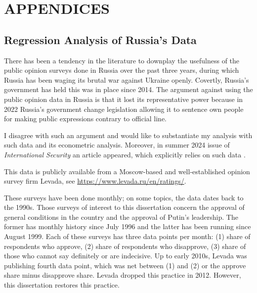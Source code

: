 %
%

\newpage 

\section*{\MakeUppercase{Appendices}}

\appendix
\renewcommand{\thesubsection}{\Alph{subsection}}

\subsection{Regression Analysis of Russia's Data}\label{reg_levada}

There has been a tendency in the literature to downplay the usefulness of the public opinion surveys done in Russia over the past three years, during which Russia has been waging its brutal war against Ukraine openly. Covertly, Russia's government has held this was in place since 2014. The argument against using the public opinion data in Russia is that it lost its representative power because in 2022 Russia's government change legislation allowing it to sentence own people for making public expressions contrary to official line.

I disagree with such an argument and would like to substantiate my analysis with such data and its econometric analysis. Moreover, in summer 2024 issue of \textit{International Security} an article appeared, which explicitly relies on such data \citep{hale2024}.

This data is publicly available from a Moscow-based and well-established opinion survey firm Levada, see {\small \url{https://www.levada.ru/en/ratings/}}.

These surveys have been done monthly; on some topics, the data dates back to the 1990s. Those surveys of interest to this dissertation concern the approval of general conditions in the country and the approval of Putin's leadership. The former has monthly history since July 1996 and the latter has been running since August 1999. Each of these surveys has three data points per month: (1) share of respondents who approve, (2) share of respondents who disapprove, (3) share of those who cannot say definitely or are indecisive. Up to early 2010s, Levada was publishing fourth data point, which was net between (1) and (2) or the approve share minus disapprove share. Levada dropped this practice in 2012. However, this dissertation restores this practice. 


